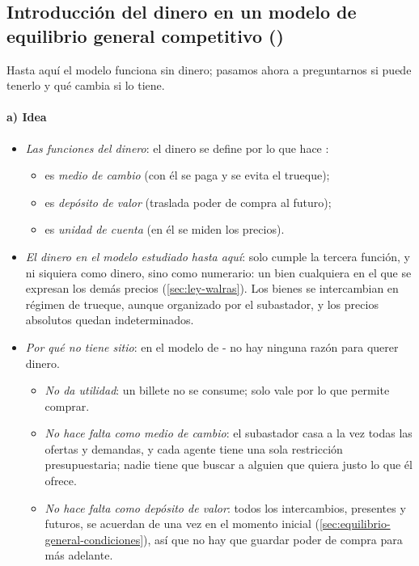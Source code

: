 \documentclass[11pt]{article}
\begin{document}
\subsection{Introducción del dinero en un modelo de equilibrio general competitivo ()}\label{sec:introduccion-dinero-modelo}

Hasta aquí el modelo funciona sin dinero; pasamos ahora a preguntarnos si puede tenerlo y qué cambia si lo tiene.

\paragraph{a) Idea}

\begin{itemize}
\item \emph{Las funciones del dinero}: el dinero se define por lo que hace :
  \begin{itemize}
  \item es \emph{medio de cambio} (con él se paga y se evita el trueque);
  \item es \emph{depósito de valor} (traslada poder de compra al futuro);
  \item es \emph{unidad de cuenta} (en él se miden los precios).
  \end{itemize}
\item \emph{El dinero en el modelo estudiado hasta aquí}: solo cumple la tercera función, y ni siquiera como dinero, sino como numerario: un bien cualquiera en el que se expresan los demás precios (\ref{sec:ley-walras}). Los bienes se intercambian en régimen de trueque, aunque organizado por el subastador, y los precios absolutos quedan indeterminados.
\item \emph{Por qué no tiene sitio}: en el modelo de - no hay ninguna razón para querer dinero.
  \begin{itemize}
  \item \emph{No da utilidad}: un billete no se consume; solo vale por lo que permite comprar.
  \item \emph{No hace falta como medio de cambio}: el subastador casa a la vez todas las ofertas y demandas, y cada agente tiene una sola restricción presupuestaria; nadie tiene que buscar a alguien que quiera justo lo que él ofrece.
  \item \emph{No hace falta como depósito de valor}: todos los intercambios, presentes y futuros, se acuerdan de una vez en el momento inicial (\ref{sec:equilibrio-general-condiciones}), así que no hay que guardar poder de compra para más adelante.

\end{itemize}
\end{itemize}
\end{document}
